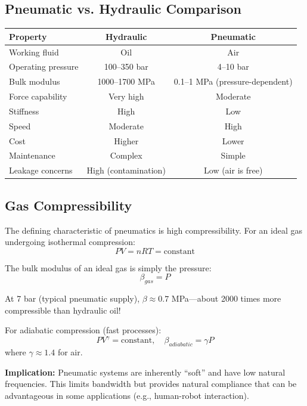 \subsection{Pneumatic vs. Hydraulic Comparison}

\begin{center}
\begin{tabular}{lcc}
\toprule
\textbf{Property} & \textbf{Hydraulic} & \textbf{Pneumatic} \\
\midrule
Working fluid & Oil & Air \\
Operating pressure & 100--350 bar & 4--10 bar \\
Bulk modulus & 1000--1700 MPa & 0.1--1 MPa (pressure-dependent) \\
Force capability & Very high & Moderate \\
Stiffness & High & Low \\
Speed & Moderate & High \\
Cost & Higher & Lower \\
Maintenance & Complex & Simple \\
Leakage concerns & High (contamination) & Low (air is free) \\
\bottomrule
\end{tabular}
\end{center}

\subsection{Gas Compressibility}

The defining characteristic of pneumatics is high compressibility. For an ideal gas undergoing isothermal compression:
\begin{equation}
    PV = nRT = \text{constant}
\end{equation}

The bulk modulus of an ideal gas is simply the pressure:
\begin{equation}
    \beta_{gas} = P
\end{equation}

At 7 bar (typical pneumatic supply), $\beta \approx 0.7$ MPa---about 2000 times more compressible than hydraulic oil!

For adiabatic compression (fast processes):
\begin{equation}
    PV^\gamma = \text{constant}, \quad \beta_{adiabatic} = \gamma P
\end{equation}
where $\gamma \approx 1.4$ for air.

\textbf{Implication:} Pneumatic systems are inherently ``soft'' and have low natural frequencies. This limits bandwidth but provides natural compliance that can be advantageous in some applications (e.g., human-robot interaction).

